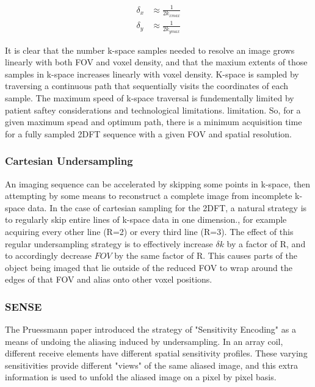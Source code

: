 \begin{equation}\label{eq:spatial_resolution}
    \begin{aligned}
        \delta_x &\approx \frac{1}{2k_{xmax}}\\
        \delta_y &\approx \frac{1}{2k_{ymax}}
    \end{aligned}
\end{equation}

It is clear that the number k-space samples needed to resolve an image grows linearly with both FOV and voxel
density, and that the maxium extents of those samples in k-space increases linearly with voxel density. K-space is
sampled by traversing a continuous path that sequentially visits the coordinates of each sample. The maximum speed of
k-space traversal is fundementally limited by patient saftey considerations and technological limitations.
limitation. So, for a given maximum spead and optimum path, there is a minimum acquisition time for a fully sampled
2DFT sequence with a given FOV and spatial resolution.

\subsubsection{Cartesian Undersampling}
An imaging sequence can be accelerated by skipping some points in k-space, then attempting by some means to reconstruct
a complete image from incomplete k-space data. In the case of cartesian sampling for the 2DFT, a natural strategy is to
regularly skip entire lines of k-space data in one dimension.\cite{Pruessmann1999}, for example acquiring every other
line (R=2) or every third line (R=3). The effect of this regular undersampling strategy is to effectively increase
$\delta k$ by a factor of R, and to accordingly decrease $FOV$ by the same factor of R. This causes parts of the object
being imaged that lie outside of the reduced FOV to wrap around the edges of that FOV and alias onto other voxel
positions.

\subsubsection{SENSE}
The Pruessmann paper \cite{Pruessmann1999} introduced the strategy of "Sensitivity Encoding" as a means of undoing the
aliasing induced by undersampling. In an array coil, different receive elements have different spatial sensitivity
profiles. These varying sensitivities provide different "views" of the same aliased image, and this extra information is
used to unfold the aliased image on a pixel by pixel basis.

